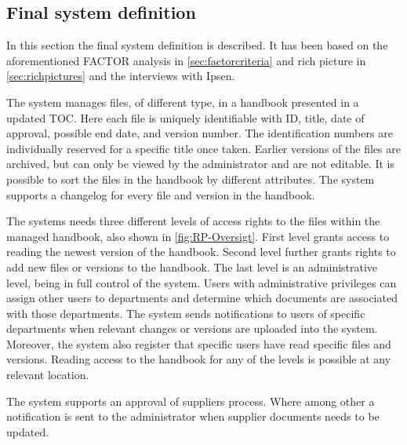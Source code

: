 \subsection{Final system definition}\label{sec:systemdefinition}
In this section the final system definition is described.
It has been based on the aforementioned FACTOR analysis in \cref{sec:factorcriteria} and rich picture in \cref{sec:richpictures} and the interviews with Ipsen.

The system manages files, of different type, in a handbook presented in a updated TOC.
Here each file is uniquely identifiable with ID, title, date of approval, possible end date, and version number.
The identification numbers are individually reserved for a specific title once taken.
Earlier versions of the files are archived, but can only be viewed by the administrator and are not editable.
It is possible to sort the files in the handbook by different attributes.
The system supports a changelog for every file and version in the handbook.

The systems needs three different levels of access rights to the files within the managed handbook, also shown in \cref{fig:RP-Oversigt}.
First level grants access to reading the newest version of the handbook.
Second level further grants rights to add new files or versions to the handbook.
The last level is an administrative level, being in full control of the system.
Users with administrative privileges can assign other users to departments and determine which documents are associated with those departments.
The system sends notifications to users of specific departments when relevant changes or versions are uploaded into the system.
Moreover, the system also register that specific users have read specific files and versions.
Reading access to the handbook for any of the levels is possible at any relevant location.

The system supports an approval of suppliers process.
Where among other a notification is sent to the administrator when supplier documents needs to be updated.
